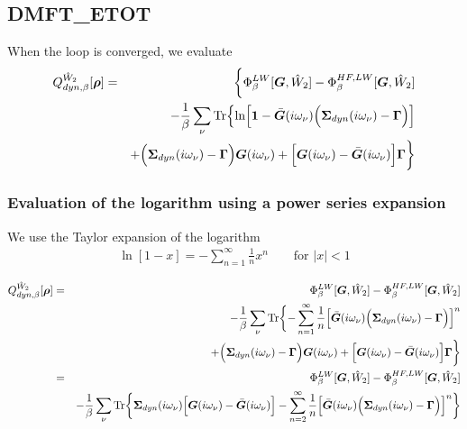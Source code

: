 \documentclass[11pt,a4paper]{report}
\begin{document}
\subsection{DMFT\_ETOT}
When the loop is converged,  we evaluate 
\begin{eqnarray}
Q^{\hat{W}_2}_{dyn,\beta}[\bm{\rho}]
&=&
\biggl\lbrace
\Phi^{LW}_\beta[\bm{G},\hat{W}_2]-\Phi^{HF,LW}_\beta[\bm{G},\hat{W}_2]
\nonumber\\
&&-\frac{1}{\beta}\sum_\nu\mathrm{Tr}\Bigl\lbrace
\ln\Bigl[
\bm{1}-
\bar{\bm{G}}(i\omega_\nu)
\Bigl(\bm{\Sigma}_{dyn}(i\omega_\nu)-\bm{\Gamma}\Bigr)
\Bigr]
\nonumber\\&&
+\Bigl(\bm{\Sigma}_{dyn}(i\omega_\nu)-\bm{\Gamma}\Bigr)\bm{G}(i\omega_\nu)
+
\Bigl[\bm{G}(i\omega_\nu)-\bar{\bm{G}}(i\omega_\nu)\Bigr]
\bm{\Gamma}
\biggr\rbrace
\nonumber\\
\label{eq:dmf1greenenergy}
\end{eqnarray}

\subsubsection{Evaluation of the logarithm using a power series expansion}
We use the Taylor expansion of the logarithm
\begin{eqnarray}
\ln[1-x]=-\sum_{n=1}^\infty \frac{1}{n}x^n \qquad\text{for $|x|<1$}
\end{eqnarray}


\begin{eqnarray}
Q^{\hat{W}_2}_{dyn,\beta}[\bm{\rho}]
&=&
\Phi^{LW}_\beta[\bm{G},\hat{W}_2]-\Phi^{HF,LW}_\beta[\bm{G},\hat{W}_2]
\nonumber\\
&&-\frac{1}{\beta}\sum_\nu\mathrm{Tr}\biggl\lbrace
-\sum_{n=1}^\infty\frac{1}{n}
\Bigl[\bar{\bm{G}}(i\omega_\nu)
\Bigl(\bm{\Sigma}_{dyn}(i\omega_\nu)-\bm{\Gamma}\Bigr)
\Bigr]^n
\nonumber\\&&
+\Bigl(\bm{\Sigma}_{dyn}(i\omega_\nu)-\bm{\Gamma}\Bigr)\bm{G}(i\omega_\nu)
+
\Bigl[\bm{G}(i\omega_\nu)-\bar{\bm{G}}(i\omega_\nu)\Bigr]
\bm{\Gamma}
\biggr\rbrace
\nonumber\\
&=&
\Phi^{LW}_\beta[\bm{G},\hat{W}_2]-\Phi^{HF,LW}_\beta[\bm{G},\hat{W}_2]
\nonumber\\
&&-\frac{1}{\beta}\sum_\nu\mathrm{Tr}\biggl\lbrace
\bm{\Sigma}_{dyn}(i\omega_\nu)
\Bigl[\bm{G}(i\omega_\nu)-\bar{\bm{G}}(i\omega_\nu)\Bigr]
-\sum_{n=2}^\infty\frac{1}{n}
\Bigl[\bar{\bm{G}}(i\omega_\nu)
\Bigl(\bm{\Sigma}_{dyn}(i\omega_\nu)-\bm{\Gamma}\Bigr)
\Bigr]^n
\biggr\rbrace
\nonumber\\
\label{eq:dmf1greenenergypower}
\end{eqnarray}
\end{document}
